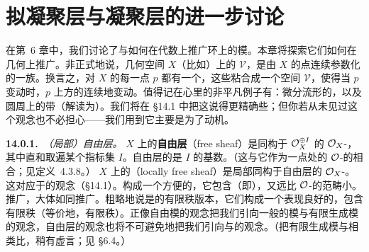 
\chapter{拟凝聚层与凝聚层的进一步讨论}
\label{ch:quasicoherent-coherent}

在第~6 章中，我们讨论了\trQCSheaf{}与\trCoherentSheaf{}如何在代数上推广环上的模。本章将探索它们如何在几何上推广\trVectorBundle。非正式地说，几何空间 $X$（比如\trManifold）上的\trVectorBundle{} $\mathcal{V}$，是由 $X$ 的点连续参数化的一族\trVectorSpace。换言之，对 $X$ 的每一点 $p$ 都有一个\trVectorSpace，这些\trVectorSpace{}粘合成一个空间 $\mathcal{V}$，使得当 $p$ 变动时，$p$ 上方的\trVectorSpace{}连续地变动。值得记在心里的非平凡例子有：微分流形的\trTangentBundle，以及圆周上的\trMobius{}带（解读为\trLineBundle）。我们将在 \S14.1 中把这说得更精确些；但你若从未见过这个观念也不必担心——我们用到它主要是为了动机。

\textbf{14.0.1.}\ \emph{（局部）自由层。}\quad \trRingedSpace{} $X$ 上的\textbf{自由层}（free sheaf）是同构于 $\mathcal{O}_X^{\oplus I}$ 的 $\mathcal{O}_X$-\trModule，其中直和取遍某个指标集 $I$。自由层的\trRank{}是 $I$ 的基数。（这与它作为一点处的 $\mathcal{O}$-\trModule{}的\trRank{}相合；见定义~4.3.8。）\trRingedSpace{} $X$ 上的\textbf{\trLocallyFreeSheaf}（locally free sheaf）是局部同构于自由层的 $\mathcal{O}_X$-\trModule。这对应于\trVectorBundle{}的观念（\S14.1）。\trQCSheaf{}构成一个方便的\trAbelianCategory，它包含\trLocallyFreeSheaf（即\trVectorBundle），又远比 $\mathcal{O}$-\trModule{}的范畴小。\trQCSheaf{}推广\trLocallyFreeSheaf，大体如同\trModule{}推广\trFreeModule。\trCoherentSheaf{}粗略地说是\trQCSheaf{}的有限秩版本，它们构成一个表现良好的\trAbelianCategory，包含有限秩\trLocallyFreeSheaf（等价地，有限秩\trVectorBundle）。正像自由模的观念把我们引向一般的模与有限生成模的观念，自由层的观念也将不可避免地把我们引向\trQCSheaf{}与\trCoherentSheaf{}的观念。（把有限生成模与\trCoherentSheaf{}相类比，稍有虚言；见 \S6.4。）







